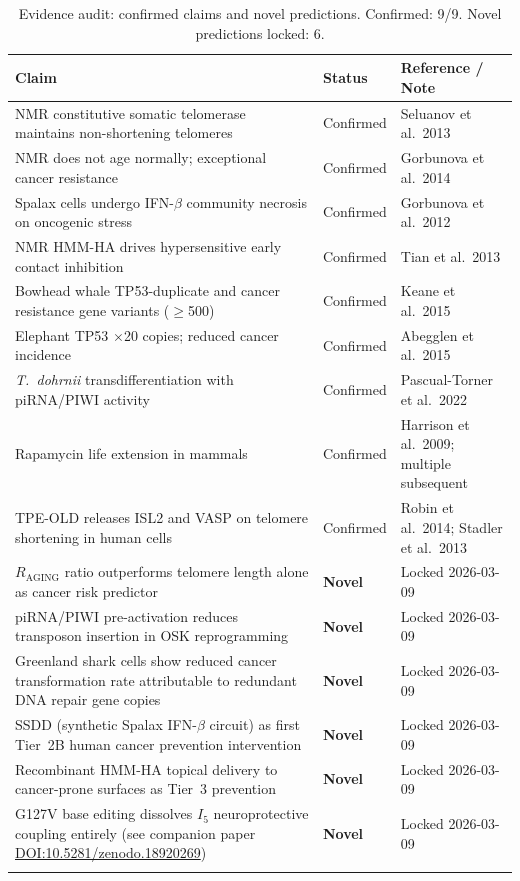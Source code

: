 \documentclass[12pt,a4paper]{article}
\newcommand{\tpeold}{TPE-OLD}
\newcommand{\Inet}[1]{$I_{#1}$}
\begin{document}
\begin{longtable}{p{7.5cm} p{2.5cm} p{3cm}}
  \toprule
  \textbf{Claim} & \textbf{Status} & \textbf{Reference / Note} \\
  \midrule
  NMR constitutive somatic telomerase maintains non-shortening telomeres &
  Confirmed & Seluanov et al.\ 2013 \\
  NMR does not age normally; exceptional cancer resistance & Confirmed &
  Gorbunova et al.\ 2014 \\
  Spalax cells undergo IFN-$\beta$ community necrosis on oncogenic stress &
  Confirmed & Gorbunova et al.\ 2012 \\
  NMR HMM-HA drives hypersensitive early contact inhibition & Confirmed &
  Tian et al.\ 2013 \\
  Bowhead whale TP53-duplicate and cancer resistance gene variants ($\geq$500) &
  Confirmed & Keane et al.\ 2015 \\
  Elephant TP53 $\times$20 copies; reduced cancer incidence & Confirmed &
  Abegglen et al.\ 2015 \\
  \textit{T.\ dohrnii} transdifferentiation with piRNA/PIWI activity &
  Confirmed & Pascual-Torner et al.\ 2022 \\
  Rapamycin life extension in mammals & Confirmed & Harrison et al.\ 2009;
  multiple subsequent \\
  \tpeold{} releases ISL2 and VASP on telomere shortening in human cells &
  Confirmed & Robin et al.\ 2014; Stadler et al.\ 2013 \\
  \midrule
  $R_{\mathrm{AGING}}$ ratio outperforms telomere length alone as cancer risk
  predictor & \textbf{Novel} & Locked 2026-03-09 \\
  piRNA/PIWI pre-activation reduces transposon insertion in OSK reprogramming &
  \textbf{Novel} & Locked 2026-03-09 \\
  Greenland shark cells show reduced cancer transformation rate attributable to
  redundant DNA repair gene copies & \textbf{Novel} & Locked 2026-03-09 \\
  SSDD (synthetic Spalax IFN-$\beta$ circuit) as first Tier~2B human cancer
  prevention intervention & \textbf{Novel} & Locked 2026-03-09 \\
  Recombinant HMM-HA topical delivery to cancer-prone surfaces as Tier~3
  prevention & \textbf{Novel} & Locked 2026-03-09 \\
  G127V base editing dissolves \Inet{5} neuroprotective coupling entirely
  (see companion paper \href{https://doi.org/10.5281/zenodo.18920269}{DOI:10.5281/zenodo.18920269}) &
  \textbf{Novel} & Locked 2026-03-09 \\
  \bottomrule
  \caption{Evidence audit: confirmed claims and novel predictions.
    Confirmed: 9/9. Novel predictions locked: 6.}
\end{longtable}
\end{document}
